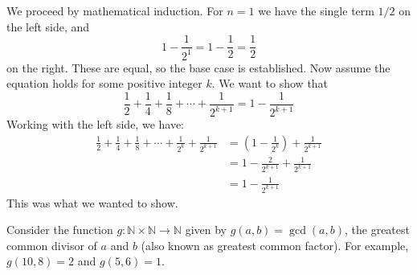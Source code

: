 \documentclass[addpoints]{exam}
\begin{document}
\begin{questions}
\begin{parts}
		\begin{solution}
			We proceed by mathematical induction. For $n=1$ we have the single term $1/2$ on the left side, and 
			\[ 1 - \frac{1}{2^1} = 1 - \frac{1}{2} = \frac{1}{2} \]
		on the right. These are equal, so the base case is established. Now assume the equation holds for some positive integer $k$. We want to show that 
			\[ \frac{1}{2} + \frac{1}{4} + \frac{1}{8} + \cdots + \frac{1}{2^{k+1}} = 1 - \frac{1}{2^{k+1}}\] 
			Working with the left side, we have: 
			\begin{align*}
				\frac{1}{2} + \frac{1}{4} + \frac{1}{8} + \cdots + \frac{1}{2^k} + \frac{1}{2^{k+1}} 
				&= \left( 1 - \frac{1}{2^k}\right) + \frac{1}{2^{k+1}} \\
				&= 1 - \frac{2}{2^{k+1}} + \frac{1}{2^{k+1}} \\
				&= 1 - \frac{1}{2^{k+1}}
			\end{align*}
		This was what we wanted to show. 

		\end{solution}
		
	\end{parts}




\question Consider the function $g: \mathbb{N} \times \mathbb{N} \to \mathbb{N}$ given by $g(a,b) = \gcd(a,b)$, the greatest common divisor of $a$ and $b$ (also known as greatest common factor). For example, $g(10, 8) = 2$ and $g(5,6) = 1$. 
\end{questions}
\end{document}
